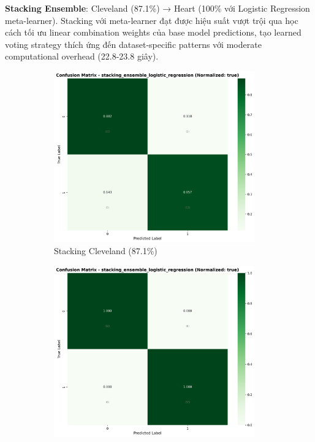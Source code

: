 \textbf{Stacking Ensemble}: Cleveland (87.1\%) → Heart (100\% với Logistic Regression meta-learner). Stacking với meta-learner đạt được hiệu suất vượt trội qua học cách tối ưu linear combination weights của base model predictions, tạo learned voting strategy thích ứng đến dataset-specific patterns với moderate computational overhead (22.8-23.8 giây).

\begin{figure}[H]
\centering
\begin{subfigure}[b]{0.48\textwidth}
\centering
\includegraphics[width=0.95\textwidth]{Result/cleveland_dataset/confusion_matrices/stacking_ensemble_logistic_regression_numeric_dataset_StandardScaler.png}
\caption{Stacking Cleveland (87.1\%)}
\label{fig:stacking_cleveland_performance}
\end{subfigure}
\hfill
\begin{subfigure}[b]{0.48\textwidth}
\centering
\includegraphics[width=0.95\textwidth]{Result/heart_dataset/confusion_matrices/stacking_ensemble_logistic_regression_numeric_dataset_StandardScaler.png}

\end{subfigure}
\end{figure}
